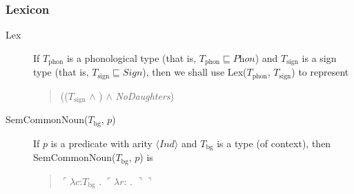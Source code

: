 \subsubsection{Lexicon}
\begin{description}
\item[\textnormal{Lex}] \mbox{}

  If $T_{\mathrm{phon}}$ is a phonological type (that is,
$T_{\mathrm{phon}}\sqsubseteq\textit{Phon}$) and $T_{\mathrm{sign}}$
is a sign type (that is, $T_{\mathrm{sign}}\sqsubseteq\textit{Sign}$), then we shall use
Lex($T_{\mathrm{phon}}$, $T_{\mathrm{sign}}$) to represent
\begin{quote}
(($T_{\mathrm{sign}}$ \d{$\wedge$}
)
\d{$\wedge$} \textit{NoDaughters})
\end{quote}





\item[\textnormal{SemCommonNoun($T_{\mathrm{bg}}$, $p$)}]
  \mbox{}

    If $p$ is a predicate with arity $\langle\textit{Ind}\rangle$ and
    $T_{\mathrm{bg}}$ is a type (of context), then
    SemCommonNoun($T_{\mathrm{bg}}$, $p$) is
  \begin{quote}
    $\ulcorner\lambda c$:$T_{\mathrm{bg}}$ . $\ulcorner\lambda
r$:
. $\urcorner\urcorner$
\end{quote}


\end{description}
